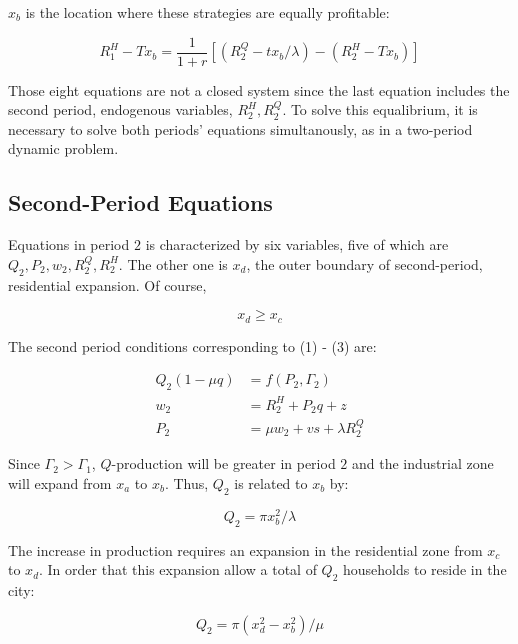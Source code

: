$x_b$ is the location where these strategies are equally profitable:

\begin{equation*}
    R_1^H - Tx_b = \frac{1}{1 + r}[(R_2^Q - tx_b / \lambda) - (R_2^H - Tx_b)]
\end{equation*}

Those eight equations are not a closed system since the last equation includes the second period, endogenous variables, $R_2^H, R_2^Q$. To solve this equalibrium, it is necessary to solve both periods' equations simultanously, as in a two-period dynamic problem.

\subsection{Second-Period Equations}

Equations in period $2$ is characterized by six variables, five of which are $Q_2, P_2, w_2, R_2^Q, R_2^H$. The other one is $x_d$, the outer boundary of second-period, residential expansion. Of course,

\begin{equation*}
    x_d \geq x_c
\end{equation*}

The second period conditions corresponding to (1) - (3) are:

\begin{equation}
    \begin{aligned}
        Q_2(1 - \mu q) & = f(P_2, \Gamma_2) \\
        w_2 & = R_2^H + P_2 q + z \\
        P_2 & = \mu w_2 + vs + \lambda R_2^Q
    \end{aligned}
\end{equation}

Since $\Gamma_2 > \Gamma_1$, $Q$-production will be greater in period $2$ and the industrial zone will expand from $x_a$ to $x_b$. Thus, $Q_2$ is related to $x_b$ by:

\begin{equation}
    Q_2 = \pi x_b^2 / \lambda
\end{equation}

The increase in production requires an expansion in the residential zone from $x_c$ to $x_d$. In order that this expansion allow a total of $Q_2$ households to reside in the city:

\begin{equation}
    Q_2 = \pi(x_d^2 - x_b^2) / \mu
\end{equation}

